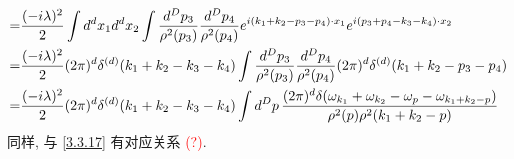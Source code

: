 \begin{itemize}
\begin{align}
		=& \frac{(- i \lambda)^2}{2} \int d^d x_1 d^d x_2 \int \frac{d^D p_3}{\rho^2(p_3)} \frac{d^D p_4}{\rho^2(p_4)} e^{i (k_1 + k_2 - p_3 - p_4) \cdot x_1} e^{i (p_3 + p_4 - k_3 - k_4) \cdot x_2} \notag \\
		=& \frac{(- i \lambda)^2}{2} (2 \pi)^d \delta^{(d)}(k_1 + k_2 - k_3 - k_4) \int \frac{d^D p_3}{\rho^2(p_3)} \frac{d^D p_4}{\rho^2(p_4)} (2 \pi)^d \delta^{(d)}(k_1 + k_2 - p_3 - p_4) \notag \\
		=& \frac{(- i \lambda)^2}{2} (2 \pi)^d \delta^{(d)}(k_1 + k_2 - k_3 - k_4) \int d^D p \, \frac{(2 \pi)^d \delta(\omega_{k_1} + \omega_{k_2} - \omega_p - \omega_{k_1 + k_2 - p})}{\rho^2(p) \rho^2(k_1 + k_2 - p)}
	\end{align}
	同样, 与 \eqref{3.3.17} 有对应关系 \textcolor{red}{(?)}.
\end{itemize}
